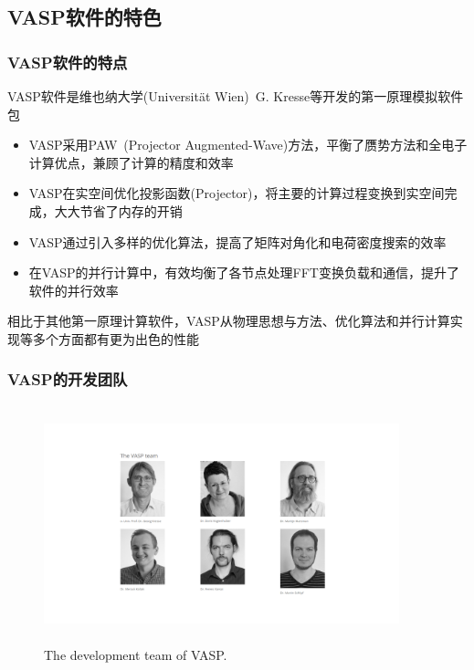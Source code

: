 \subsection{\rm{VASP}软件的特色}
\frame
{
	\frametitle{\textrm{VASP}软件的特点}
	\textrm{VASP}软件是维也纳大学\textrm{(Universit\"at Wien)}~\textrm{G. Kresse}等开发的第一原理模拟软件包
	\begin{itemize}
		\item \textrm{VASP}采用\textrm{PAW~(Projector Augmented-Wave)}方法，平衡了赝势方法和全电子计算优点，兼顾了计算的精度和效率
		\item \textrm{VASP}在实空间优化投影函数\textrm{(Projector)}，将主要的计算过程变换到实空间完成，大大节省了内存的开销%
		\item \textrm{VASP}通过引入多样的优化算法，提高了矩阵对角化和电荷密度搜索的效率
		\item 在\textrm{VASP}的并行计算中，有效均衡了各节点处理\textrm{FFT}变换负载和通信，提升了软件的并行效率
	\end{itemize}
	相比于其他第一原理计算软件，\textrm{VASP}从物理思想与方法、优化算法和并行计算实现等多个方面都有更为出色的性能
}

\frame
{
	\frametitle{\textrm{VASP}的开发团队}
\begin{figure}[h!]
\centering
\vspace*{-0.25in}
\includegraphics[height=2.70in,width=4.05in,viewport=330 130 1280 770,clip]{Figures/VASP_team.png}
\caption{\tiny \textrm{The development team of VASP.}}%
\label{VASP_team}
\end{figure}
}

